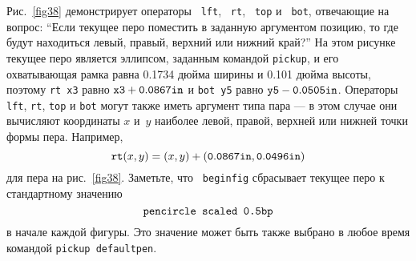 \documentclass{article} %
\begin{document}
Рис.~\ref{fig38} демонстрирует операторы {\tt
lft}\label{Dlft}, {\tt
rt}\label{Drt}, {\tt
top}\label{Dtop} и {\tt
bot}\label{Dbot}, отвечающие на вопрос: 
``Если текущее перо поместить в заданную аргументом позицию, то где 
будут находиться левый, правый, верхний или нижний край?'' 
На этом рисунке текущее перо является эллипсом, заданным командой 
{\tt pickup}, и его охватывающая рамка равна 0.1734 дюйма ширины и 
0.101 дюйма высоты, поэтому {\tt rt
x3} равно ${\tt x3}+{\tt 0.0867in}$ и {\tt bot y5} равно ${\tt y5}-{\tt
0.0505in}$. 
Операторы {\tt lft}, {\tt rt}, {\tt top} и {\tt bot} могут также иметь 
аргумент типа пара --- в этом случае они вычисляют координаты $x$
и~$y$ наиболее левой, правой, верхней или нижней точки формы пера.
Например, 
$$ {\tt rt}(x,y) = (x,y)+({\tt 0.0867in}, {\tt 0.0496in}) $$
для пера на рис.~\ref{fig38}. 
Заметьте, что {\tt
beginfig} сбрасывает текущее перо к 
стандартному значению 
$$ \hbox{\tt pencircle scaled 0.5bp} $$
в начале каждой фигуры.
Это значение может быть также выбрано в любое время командой {\tt pickup
defaultpen}\label{Ddefaultpen}.
\end{document}
